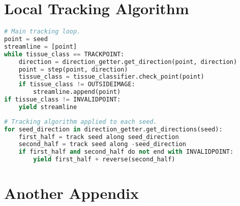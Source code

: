 \begin{appendices}

\section{Local Tracking Algorithm}
\label{appendix:algo}

\begin{lstlisting}[language=python]
# Main tracking loop.
point = seed
streamline = [point]
while tissue_class == TRACKPOINT:
    direction = direction_getter.get_direction(point, direction)
    point = step(point, direction)
    tissue_class = tissue_classifier.check_point(point)
    if tissue_class != OUTSIDEIMAGE:
        streamline.append(point)
if tissue_class != INVALIDPOINT:
    yield streamline
\end{lstlisting}

\begin{lstlisting}[language=python]
# Tracking algorithm applied to each seed.
for seed_direction in direction_getter.get_directions(seed):
    first_half = track seed along seed_direction
    second_half = track seed along -seed_direction
    if first_half and second_half do not end with INVALIDPOINT:
        yield first_half + reverse(second_half)
\end{lstlisting}

\section{Another Appendix}

\end{appendices}

